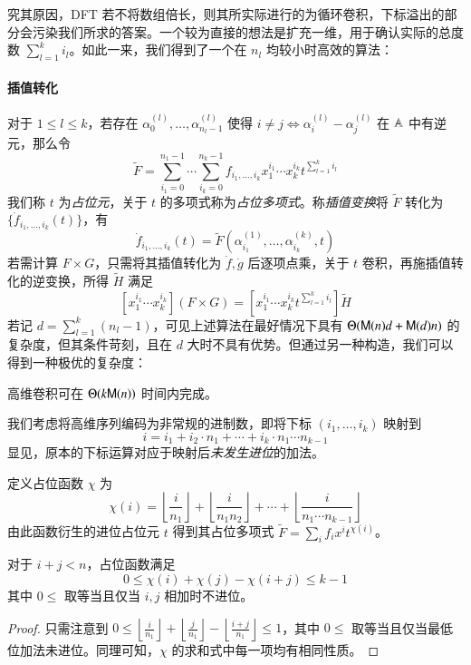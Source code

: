 究其原因，DFT 若不将数组倍长，则其所实际进行的为循环卷积，下标溢出的部分会污染我们所求的答案。一个较为直接的想法是扩充一维，用于确认实际的总度数 $\sum_{l=1}^k i_l$。如此一来，我们得到了一个在 $n_l$ 均较小时高效的算法：

\paragraph{插值转化}
对于 $1\le l\le k$，若存在 $\alpha^{(l)}_0,\dots,\alpha^{(l)}_{n_l-1}$ 使得 $i\neq j \Leftrightarrow \alpha^{(l)}_i - \alpha^{(l)}_j$ 在 $\mathbb A$ 中有逆元，那么令 
$$
\tilde F = \sum_{i_1=0}^{n_1-1} \cdots \sum_{i_k=0}^{n_k-1} f_{i_1,\dots,i_k} x_1^{i_1}\cdots x_k^{i_k} t^{\sum_{l=1}^k i_l}
$$
我们称 $t$ 为\emph{占位元}，关于 $t$ 的多项式称为\emph{占位多项式}。称\emph{插值变换}将 $\tilde F$ 转化为 $\{\dot f_{i_1,\dots,i_k}(t)\}$，有
$$
\dot f_{i_1,\dots,i_k}(t) = \tilde F(\alpha^{(1)}_{i_1},\dots,\alpha^{(k)}_{i_k},t)
$$
若需计算 $F\times G$，只需将其插值转化为 $\dot f, \dot g$ 后逐项点乘，关于 $t$ 卷积，再施插值转化的逆变换，所得 $\tilde H$ 满足
$$
[x_1^{i_1}\cdots x_k^{i_k}] (F\times G) = \left[x_1^{i_1}\cdots x_k^{i_k}t^{\sum_{l=1}^k i_l}\right] \tilde H
$$
若记 $d = \sum_{l=1}^k (n_l-1)$，可见上述算法在最好情况下具有 $\Theta(\mathsf M(n)d + \mathsf M(d)n)$ 的复杂度，但其条件苛刻，且在 $d$ 大时不具有优势。但通过另一种构造，我们可以得到一种极优的复杂度：

\begin{theorem}
高维卷积可在 $\Theta(k\mathsf M(n))$ 时间内完成。
\end{theorem}

我们考虑将高维序列编码为非常规的进制数，即将下标 $(i_1,\dots,i_k)$ 映射到
$$
i = i_1 + i_2\cdot n_1 + \cdots + i_k \cdot n_1\cdots n_{k-1}
$$
显见，原本的下标运算对应于映射后\emph{未发生进位}的加法。

\begin{definition}[进位占位元]
定义占位函数 $\chi$ 为
$$
\chi(i) = \left\lfloor \frac{i}{n_1}\right\rfloor + \left\lfloor \frac{i}{n_1n_2}\right\rfloor + \cdots + \left\lfloor \frac{i}{n_1\cdots n_{k-1}}\right\rfloor
$$
由此函数衍生的进位占位元 $t$ 得到其占位多项式 $\tilde F = \sum_i f_i x^i t^{\chi (i)}$。
\end{definition}

\begin{lemma}
对于 $i+j<n$，占位函数满足
$$
0\le \chi(i) + \chi(j) - \chi(i+j) \le k-1
$$
其中 $0\le $ 取等当且仅当 $i,j$ 相加时不进位。
\end{lemma}

\begin{proof}
只需注意到 $0\le \left\lfloor \frac{i}{n_1}\right\rfloor + \left\lfloor \frac{j}{n_1}\right\rfloor - \left\lfloor \frac{i+j}{n_1}\right\rfloor\le 1$，其中 $0\le $ 取等当且仅当最低位加法未进位。同理可知，$\chi$ 的求和式中每一项均有相同性质。
\end{proof}

